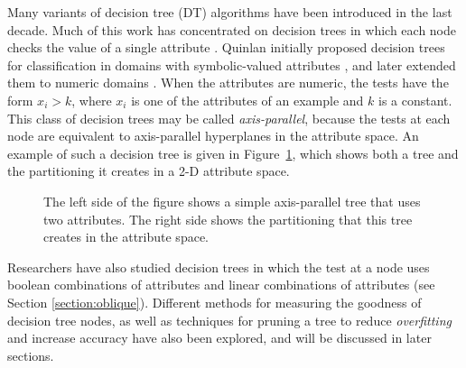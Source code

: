 Many variants of decision tree (DT) algorithms have been introduced in
the last decade.  Much of this work has concentrated on decision trees
in which each node checks the value of a single attribute
\cite{breiman/etal/84,quinlan/86,quinlan/93}.  Quinlan initially
proposed decision trees for classification in domains with
symbolic-valued attributes
\citeyear{quinlan/86}, and later extended them to numeric domains
\citeyear{quinlan/87b}.  When the attributes are numeric, the tests 
have the form $x_i > k$, where $x_i$ is one of the attributes of an
example and $k$ is a constant.  This class of decision trees may be
called {\it axis-parallel}, because the tests at each node are
equivalent to axis-parallel hyperplanes in the attribute space.  An
example of such a decision tree is given in
Figure~\ref{figure:aptree}, which shows both a tree and the
partitioning it creates in a 2-D attribute space.
\begin{figure}
\vspace{2.0in}
\caption{The left side of the figure shows a simple axis-parallel tree 
that uses two attributes.  The right side shows the partitioning
that this tree creates in the attribute space.}
\label{figure:aptree}
\vspace*{-.2in} 
\end{figure}

Researchers have also studied decision trees in which the test at a
node uses boolean combinations of attributes
\cite{pagallo/90,pagallo/haussler/90,sahami/93} and linear combinations
of attributes (see Section \ref{section:oblique}).  Different methods
for measuring the goodness of decision tree nodes, as well as
techniques for pruning a tree to reduce {\it overfitting} and increase
accuracy have also been explored, and will be discussed in later
sections.

